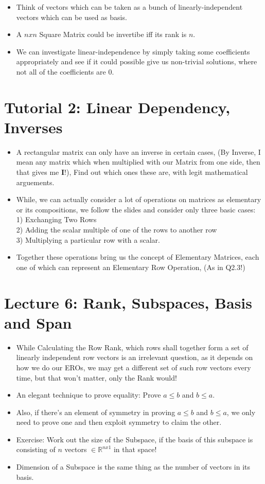\documentclass{article}
\begin{document}
\begin{itemize}
  \item Think of vectors which can be taken as a bunch of linearly-independent vectors which can be used as basis.
  \item A $nxn$ Square Matrix could be invertibe iff its rank is $n$.
  \item We can investigate linear-independence by simply taking some coefficients appropriately and see if
  it could possible give us non-trivial solutions, where not all of the coefficients are 0.

\end{itemize}

\section{Tutorial 2: Linear Dependency, Inverses}
\begin{itemize}
  \item A rectangular matrix can only have an inverse in certain cases, (By Inverse, I mean any matrix which when multiplied with our Matrix from one side, then that gives me $\mathbf{I}$!), Find out which ones these are, with legit mathematical arguements.
  \item  While, we can actually consider a lot of operations on matrices as elementary or its compositions, we follow the slides and consider only three basic cases:\\ 1) Exchanging Two Rows \\
  2) Adding the scalar multiple of one of the rows to another row \\ 3) Multiplying a particular row with a scalar.
  \item Together these operations bring us the concept of Elementary Matrices, each one of which can represent an Elementary Row Operation, (As in Q2.3!)
\end{itemize}
\section{Lecture 6: Rank, Subspaces, Basis and Span}
  \begin{itemize}
    \item While Calculating the Row Rank, which rows shall together form a set of linearly independent row vectors is an irrelevant question, as it depends on how we do our EROs, we may get a different set of such row vectors every time, but that won't matter, only the Rank would!
    \item An elegant technique to prove equality: Prove $a \leq b$ and $b \leq a$.
    \item Also, if there's an element of symmetry in proving $a \leq b$ and $b \leq a$, we only need to prove one and then exploit symmetry to claim the other.
    \item Exercise: Work out the size of the Subspace, if the basis of this subspace is consisting of $n$ vectors $\in \mathbb{R}^{nx1}$ in that space!
    \item Dimension of a Subspace is the same thing as the number of vectors in its basis.

  \end{itemize}
\end{document}
